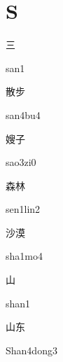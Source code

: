 ﻿%
\section*{S}

\begin{verbete}[san1]{三}
\begin{pronuncia}{san1}
\end{pronuncia}
\end{verbete}

\begin{verbete}[san4bu4]{散步}
\begin{pronuncia}{san4bu4}
\end{pronuncia}
\end{verbete}

\begin{verbete}[sao3zi0]{嫂子}
\begin{pronuncia}{sao3zi0}
\end{pronuncia}
\end{verbete}

\begin{verbete}{森林}
\begin{pronuncia}{sen1lin2}
\end{pronuncia}
\end{verbete}

\begin{verbete}[sha1mo4]{沙漠}
\begin{pronuncia}{sha1mo4}
\end{pronuncia}
\end{verbete}

\begin{verbete}[shan1]{山}
\begin{pronuncia}{shan1}
\end{pronuncia}
\end{verbete}

\begin{verbete}{山东}
\begin{pronuncia}{Shan4dong3}
\end{pronuncia}
\end{verbete}


